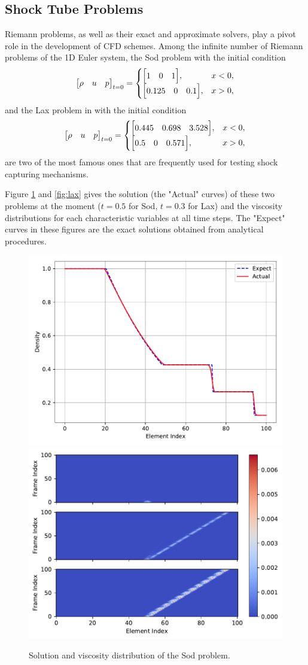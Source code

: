 \documentclass[10pt]{article}
\begin{document}
\subsection{Shock Tube Problems}
Riemann problems, as well as their exact and approximate solvers, play a pivot role in the development of CFD schemes.
Among the infinite number of Riemann problems of the 1D Euler system, the Sod problem with the initial condition
\begin{equation}
\mqty[\rho & u & p]_{t=0}
=
\begin{cases}
\mqty[1 & 0 & 1], &x<0,\\
\mqty[0.125 & 0 & 0.1], &x>0,\\
\end{cases}
\end{equation}
and the Lax problem in with the initial condition
\begin{equation}
\mqty[\rho & u & p]_{t=0}
=
\begin{cases}
\mqty[0.445 & 0.698 & 3.528], &x<0,\\
\mqty[0.5 & 0 & 0.571], &x>0,\\
\end{cases}
\end{equation}
are two of the most famous ones that are frequently used for testing shock capturing mechanisms.

Figure \ref{fig:sod} and \ref{fig:lax} gives the solution (the "Actual" curves) of these two problems at the moment ($t=0.5$ for Sod, $t=0.3$ for Lax) and the viscosity distributions for each characteristic variables at all time steps.
The "Expect" curves in these figures are the exact solutions obtained from analytical procedures.
\begin{figure}[H]
  \centering
  \includegraphics[width=.49\textwidth]{./sod/Frame100.pdf}
  \includegraphics[width=.49\textwidth]{./sod/Viscosity.pdf}
  \caption{Solution and viscosity distribution of the Sod problem.}
  \label{fig:sod}
\end{figure}
\end{document}
